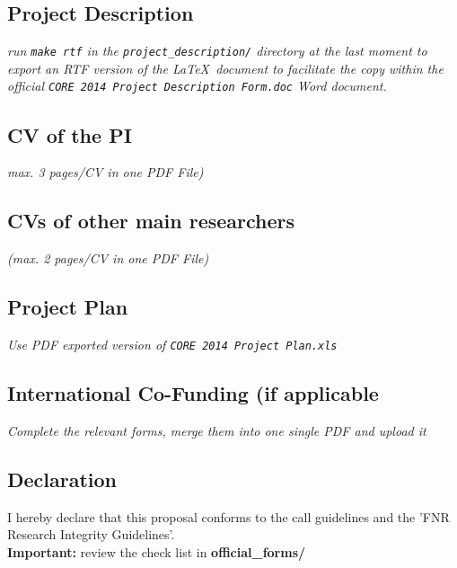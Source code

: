 \documentclass[11pt,twoside,a4paper]{article}
\begin{document}
\subsection{Project Description}
\emph{run \texttt{make rtf} in the \texttt{project\_description/} directory at
  the last moment to export an RTF version of the \LaTeX\ document to facilitate the copy within
  the official \texttt{CORE\ 2014\ Project\ Description\ Form.doc} Word
  document. }


\subsection{CV of the PI}
\emph{max. 3 pages/CV in one PDF File)}



\subsection{CVs of other main researchers}
\emph{ (max. 2 pages/CV in one PDF File)}


\subsection{Project Plan}
\emph{Use PDF exported version of \texttt{CORE\ 2014\ Project\ Plan.xls}}

\subsection{International Co-Funding (if applicable}
\emph{Complete the relevant forms, merge them into one single PDF and upload it}


\subsection{Declaration}


I hereby declare that this proposal conforms to the call guidelines and the 'FNR
Research Integrity Guidelines'.
\\

\noindent 
\textbf{Important:} review the check list in \textbf{official\_forms/}




\end{document}
